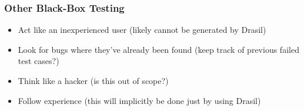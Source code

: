 \subsubsection{Other Black-Box Testing \cite[p.~87-89]{patton_software_2006}}
\begin{itemize}
      \item Act like an inexperienced user (likely cannot be generated by Drasil)
      \item Look for bugs where they've already been found (keep track of
            previous failed test cases?)
      \item Think like a hacker (is this out of scope?)
      \item Follow experience (this will implicitly be done just by using Drasil)
\end{itemize}
